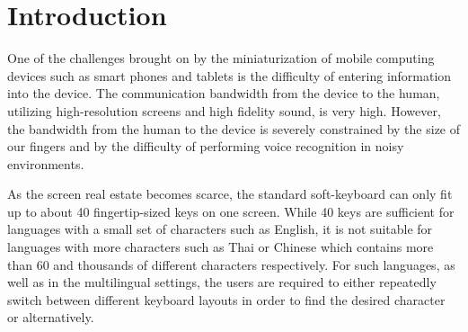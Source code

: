 \documentclass{sigchi}
\begin{document}



\section{Introduction}

One of the challenges brought on by the miniaturization of mobile
computing devices such as smart phones and tablets is the difficulty of
entering information into the device. The communication bandwidth from
the device to the human, utilizing high-resolution screens and high
fidelity sound, is very high. However, the bandwidth from the human to
the device is severely constrained by the size of our fingers and by
the difficulty of performing voice recognition in noisy environments.

As the screen real estate becomes scarce, the standard soft-keyboard
can only fit up to about 40 fingertip-sized keys on one screen. While
40 keys are sufficient for languages with a small set of characters
such as English, it is not suitable for languages with more characters
such as Thai or Chinese which contains more than 60 and thousands of
different characters respectively. For such languages, as well as in
the multilingual settings, the users are required to either repeatedly
switch between different keyboard layouts in order to find the desired
character or alternatively.

\newcommand{\tm}{\textsuperscript{\textregistered}~}
\end{document}
